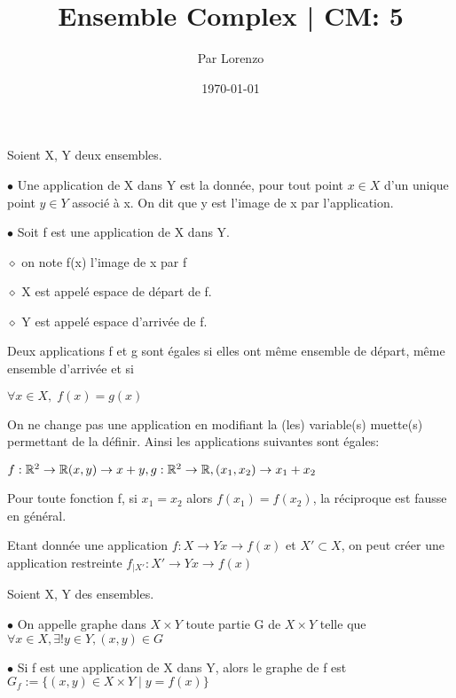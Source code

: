 \documentclass[a4paper, 12pt]{article}
\title{Ensemble Complex | CM: 5}
\author{Par Lorenzo}
\date{\today}
\begin{document}
\maketitle

\begin{definition}
    Soient X, Y deux ensembles.

    \item $\bullet$ Une application de X dans Y est la donnée, pour tout point
    $x \in X$ d'un unique point $y \in Y$ associé à x.
    On dit que y est l'image de x par l'application.

    \item $\bullet$ Soit f est une application de X dans Y.
    \item $\diamond$ on note f(x) l'image de x par f
    \item $\diamond$ X est appelé espace de départ de f.
    \item $\diamond$ Y est appelé espace d'arrivée de f.
    \item %
\end{definition}

\begin{remark}
    Deux applications f et g sont égales si elles ont même ensemble de départ, même ensemble d'arrivée et si

    $\forall x \in X, \; f(x) = g(x)$
\end{remark}

\begin{remark}
    On ne change pas une application en modifiant la (les) variable(s) muette(s) permettant de la définir. Ainsi les applications suivantes sont égales:

    $f : \mathbb{R}^2 \to \mathbb{R} (x, y) \to x + y,     g : \mathbb{R}^2 \to \mathbb{R} , (x_1, x_2) \to x_1 + x_2$
\end{remark}

\begin{remark}
    Pour toute fonction f, si $x_1 = x_2$ alors $f(x_1) = f(x_2)$, la réciproque est fausse en général.
\end{remark}

\begin{remark}
    Etant donnée une application $f: X \to Y   x \to f(x)$ et $X' \subset X$, on peut créer une application restreinte $f_{\mid X'}: X' \to Y    x \to f(x)$
\end{remark}

\begin{definition}
    Soient X, Y des ensembles.

    \item $\bullet$ On appelle graphe dans $X \times Y$ toute partie G de $X \times Y$
    telle que $\forall x \in X, \exists! y \in Y, (x, y) \in G$

    \item $\bullet$ Si f est une application de X dans Y, alors le graphe de f est
    $G_f := \{(x, y) \in X \times Y \mid y = f(x)\}$
\end{definition}
\end{document}
